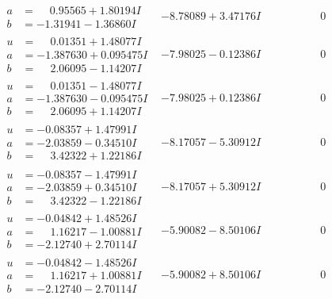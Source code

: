 \documentclass[1p]{elsarticle_modified}
\theoremstyle{definition}
\begin{document}
$$\begin{array}{c|c|c}
\begin{aligned}
a &= \phantom{-}0.95565 + 1.80194 I \\
b &= -1.31941 - 1.36860 I\end{aligned}
 & -8.78089 + 3.47176 I & \phantom{-0.000000 } 0 \\ \hline\begin{aligned}
u &= \phantom{-}0.01351 + 1.48077 I \\
a &= -1.387630 + 0.095475 I \\
b &= \phantom{-}2.06095 - 1.14207 I\end{aligned}
 & -7.98025 - 0.12386 I & \phantom{-0.000000 } 0 \\ \hline\begin{aligned}
u &= \phantom{-}0.01351 - 1.48077 I \\
a &= -1.387630 - 0.095475 I \\
b &= \phantom{-}2.06095 + 1.14207 I\end{aligned}
 & -7.98025 + 0.12386 I & \phantom{-0.000000 } 0 \\ \hline\begin{aligned}
u &= -0.08357 + 1.47991 I \\
a &= -2.03859 - 0.34510 I \\
b &= \phantom{-}3.42322 + 1.22186 I\end{aligned}
 & -8.17057 - 5.30912 I & \phantom{-0.000000 } 0 \\ \hline\begin{aligned}
u &= -0.08357 - 1.47991 I \\
a &= -2.03859 + 0.34510 I \\
b &= \phantom{-}3.42322 - 1.22186 I\end{aligned}
 & -8.17057 + 5.30912 I & \phantom{-0.000000 } 0 \\ \hline\begin{aligned}
u &= -0.04842 + 1.48526 I \\
a &= \phantom{-}1.16217 - 1.00881 I \\
b &= -2.12740 + 2.70114 I\end{aligned}
 & -5.90082 - 8.50106 I & \phantom{-0.000000 } 0 \\ \hline\begin{aligned}
u &= -0.04842 - 1.48526 I \\
a &= \phantom{-}1.16217 + 1.00881 I \\
b &= -2.12740 - 2.70114 I\end{aligned}
 & -5.90082 + 8.50106 I & \phantom{-0.000000 } 0 \\ \hline\begin{aligned}

\end{aligned}
\end{array}$$
\end{document}
